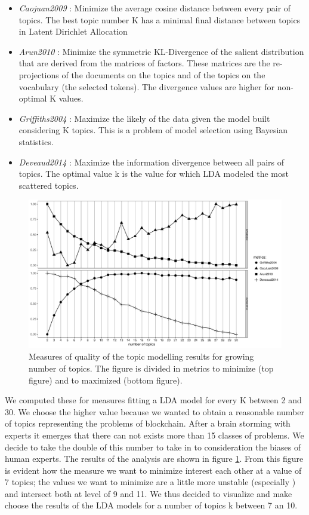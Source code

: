 \documentclass[b5paper,]{book}
\providecommand{\tightlist}{%
  \setlength{\itemsep}{0pt}\setlength{\parskip}{0pt}}
\theoremstyle{definition}
\theoremstyle{definition}
\theoremstyle{definition}
\theoremstyle{remark}
\begin{document}
\begin{itemize}
\tightlist
\item
  \emph{Caojuan2009} \citep{cao2009density}: Minimize the average cosine
  distance between every pair of topics. The best topic number K has a
  minimal final distance between topics in Latent Dirichlet Allocation
\item
  \emph{Arun2010} \citep{arun2010finding}: Minimize the symmetric
  KL-Divergence of the salient distribution that are derived from the
  matrices of factors. These matrices are the re-projections of the
  documents on the topics and of the topics on the vocabulary (the
  selected tokens). The divergence values are higher for non-optimal K
  values.
\item
  \emph{Griffiths2004} \citep{griffiths2004finding}: Maximize the likely
  of the data given the model built considering K topics. This is a
  problem of model selection using Bayesian statistics.
\item
  \emph{Deveaud2014} \citep{deveaud2014accurate}: Maximize the
  information divergence between all pairs of topics. The optimal value
  k is the value for which LDA modeled the most scattered topics.
\end{itemize}

\begin{figure}

{\centering \includegraphics[width=0.6\linewidth]{_bookdown_files/figures/FindTopicsNumber_plot_bl} 

}

\caption{Measures of quality of the topic modelling results for growing number of topics. The figure is divided in metrics to minimize (top figure) and to maximized (bottom figure).}\label{fig:topicnumsmbl}
\end{figure}

We computed these for measures fitting a LDA model for every K between 2
and 30. We choose the higher value because we wanted to obtain a
reasonable number of topics representing the problems of blockchain.
After a brain storming with experts it emerges that there can not exists
more than 15 classes of problems. We decide to take the double of this
number to take in to consideration the biases of human experts. The
results of the analysis are shown in figure \ref{fig:topicnumsmbl}. From
this figure is evident how the measure we want to minimize interest each
other at a value of 7 topics; the values we want to minimize are a
little more unstable (especially \citep{arun2010finding}) and intersect
both at level of 9 and 11. We thus decided to visualize and make choose
the results of the LDA models for a number of topics k between 7 an 10.
\end{document}
